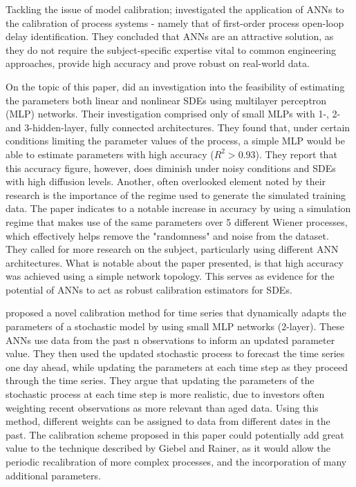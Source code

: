 \documentclass[11pt,oneside,openany,a4paper,english, report, goldenblock
]{usthesis}
\begin{document}
Tackling the issue of model calibration; \citet{Samad} investigated the application of ANNs to the calibration of process systems - namely that of first-order process open-loop delay identification. They concluded that ANNs are an attractive solution, as they do not require the subject-specific expertise vital to common engineering approaches, provide high accuracy and prove robust on real-world data.


On the topic of this paper, \citet{Xie} did an investigation into the feasibility of estimating the parameters both linear and nonlinear SDEs using multilayer perceptron (MLP) networks. Their investigation comprised only of small MLPs with 1-, 2- and 3-hidden-layer, fully connected architectures. They found that, under certain conditions limiting the parameter values of the process, a simple MLP would be able to estimate parameters with high accuracy ($R^2 > 0.93$). They report that this accuracy figure, however, does diminish under noisy conditions and SDEs with high diffusion levels. Another, often overlooked element noted by their research is the importance of the regime used to generate the simulated training data. The paper indicates to a notable increase in accuracy by using a simulation regime that makes use of the same parameters over 5 different Wiener processes, which effectively helps remove the "randomness" and noise from the dataset. They called for more research on the subject, particularly using different ANN architectures. What is notable about the paper presented, is that high accuracy was achieved using a simple network topology. This serves as evidence for the potential of ANNs to act as robust calibration estimators for SDEs.


\citet{Giebel} proposed a novel calibration method for time series that dynamically adapts the parameters of a stochastic model by using small MLP networks (2-layer). These ANNs use data from the past n observations to inform an updated parameter value. They then used the updated stochastic process to forecast the time series one day ahead, while updating the parameters at each time step as they proceed through the time series. They argue that updating the parameters of the stochastic process at each time step is more realistic, due to investors often weighting recent observations as more relevant than aged data. Using this method, different weights can be assigned to data from different dates in the past. The calibration scheme proposed in this paper could potentially add great value to the technique described by Giebel and Rainer, as it would allow the periodic recalibration of more complex processes, and the incorporation of many additional parameters. 
\end{document}
